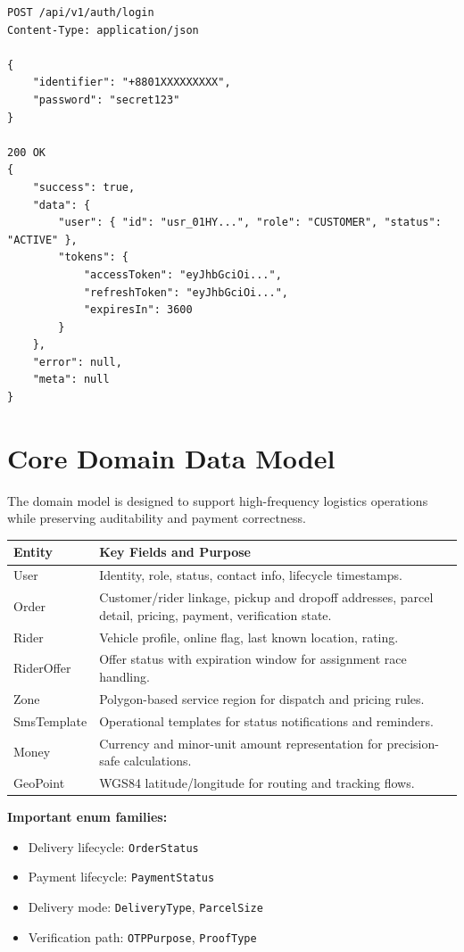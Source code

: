 \begin{lstlisting}[caption={Request/response example for authentication}]
POST /api/v1/auth/login
Content-Type: application/json

{
	"identifier": "+8801XXXXXXXXX",
	"password": "secret123"
}

200 OK
{
	"success": true,
	"data": {
		"user": { "id": "usr_01HY...", "role": "CUSTOMER", "status": "ACTIVE" },
		"tokens": {
			"accessToken": "eyJhbGciOi...",
			"refreshToken": "eyJhbGciOi...",
			"expiresIn": 3600
		}
	},
	"error": null,
	"meta": null
}
\end{lstlisting}

\section{Core Domain Data Model}

The domain model is designed to support high-frequency logistics operations
while preserving auditability and payment correctness.

\begin{tabularx}{\textwidth}{@{}p{2.8cm}X@{}}
\toprule
\textbf{Entity} & \textbf{Key Fields and Purpose} \\
\midrule
User & Identity, role, status, contact info, lifecycle timestamps. \\
Order & Customer/rider linkage, pickup and dropoff addresses, parcel detail, pricing, payment, verification state. \\
Rider & Vehicle profile, online flag, last known location, rating. \\
RiderOffer & Offer status with expiration window for assignment race handling. \\
Zone & Polygon-based service region for dispatch and pricing rules. \\
SmsTemplate & Operational templates for status notifications and reminders. \\
Money & Currency and minor-unit amount representation for precision-safe calculations. \\
GeoPoint & WGS84 latitude/longitude for routing and tracking flows. \\
\bottomrule
\end{tabularx}

\vspace{6pt}
\noindent\textbf{Important enum families:}
\begin{itemize}
		\item Delivery lifecycle: \texttt{OrderStatus}
		\item Payment lifecycle: \texttt{PaymentStatus}
		\item Delivery mode: \texttt{DeliveryType}, \texttt{ParcelSize}
		\item Verification path: \texttt{OTPPurpose}, \texttt{ProofType}
\end{itemize}

